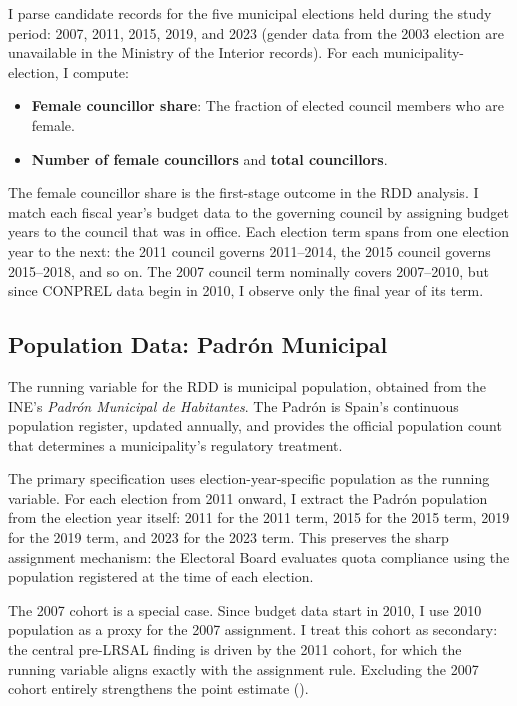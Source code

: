 \documentclass[12pt]{article}
\begin{document}
I parse candidate records for the five municipal elections held during the study period: 2007, 2011, 2015, 2019, and 2023 (gender data from the 2003 election are unavailable in the Ministry of the Interior records). For each municipality-election, I compute:

\begin{itemize}
    \item \textbf{Female councillor share}: The fraction of elected council members who are female.
    \item \textbf{Number of female councillors} and \textbf{total councillors}.
\end{itemize}

The female councillor share is the first-stage outcome in the RDD analysis. I match each fiscal year's budget data to the governing council by assigning budget years to the council that was in office. Each election term spans from one election year to the next: the 2011 council governs 2011--2014, the 2015 council governs 2015--2018, and so on. The 2007 council term nominally covers 2007--2010, but since CONPREL data begin in 2010, I observe only the final year of its term.

\subsection{Population Data: Padr\'{o}n Municipal}

The running variable for the RDD is municipal population, obtained from the INE's \emph{Padr\'{o}n Municipal de Habitantes}. The Padr\'{o}n is Spain's continuous population register, updated annually, and provides the official population count that determines a municipality's regulatory treatment.

The primary specification uses election-year-specific population as the running variable. For each election from 2011 onward, I extract the Padr\'{o}n population from the election year itself: 2011 for the 2011 term, 2015 for the 2015 term, 2019 for the 2019 term, and 2023 for the 2023 term. This preserves the sharp assignment mechanism: the Electoral Board evaluates quota compliance using the population registered at the time of each election.

The 2007 cohort is a special case. Since budget data start in 2010, I use 2010 population as a proxy for the 2007 assignment. I treat this cohort as secondary: the central pre-LRSAL finding is driven by the 2011 cohort, for which the running variable aligns exactly with the assignment rule. Excluding the 2007 cohort entirely strengthens the point estimate ().
\end{document}
